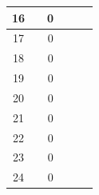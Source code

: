 \begin{table}[]
\begin{tabular}{|c|c|c|c|c|c|}
 			16                                           &                                  & 0                                &                                  &                                  &                                                     \\ \hline
 			17                                           &                                  & 0                                &                                  &                                  &                                                     \\ \hline
 			18                                           &                                  & 0                                &                                  &                                  &                                                     \\ \hline
 			19                                           &                                  & 0                                &                                  &                                  &                                                     \\ \hline
 			20                                           &                                  & 0                                &                                  &                                  &                                                     \\ \hline
 			21                                           &                                  & 0                                &                                  &                                  &                                                     \\ \hline
 			22                                           &                                  & 0                                &                                  &                                  &                                                     \\ \hline
 			23                                           &                                  & 0                                &                                  &                                  &                                                     \\ \hline
 			24                                           &                                  & 0                                &                                  &                                  &                                                     \\ \hline

\end{tabular}
\end{table}
